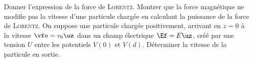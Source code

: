\documentclass[a4paper, 10pt, final, garamond]{book}
\begin{document}
\begin{enumerate}[label=\sqenumi]
\begin{isd}[lefthand ratio=.3]
\begin{isd}[sidebyside align=top]
\begin{center}
			\end{center}
		\end{isd}
	\end{isd}
	Donner l'expression de la force de \textsc{Lorentz}. Montrer que la force
	magnétique ne modifie pas la vitesse d'une particule chargée en calculant la
	puissance de la force de \textsc{Lorentz}.
	\smallbreak
	\vspace{-15pt}
	\psw{
		\[
			\Ff \stm{=} q \left( \Ef + \vf \wedge \Bf \right)
			\Ra
			\Pc(\Ff) = q \left( \Ef + \vf \wedge \Bf \right)\cdot \vf
			= q\Ef\cdot\vf +
			q\underbracket[1pt]{\underbracket[1pt]{\vf\wedge\Bf}_{\perp\vf}\cdot\vf}_{=0}
			\Lra
			\boxed{\Pc(\Ff) \stm[-1]{=} q\Ef\cdot\vf} \stm{=} \dv{\Ec_c}{t}
		\]
	}
	\vspace{-15pt}
	On suppose une particule chargée positivement, arrivant en $z = 0$ à la vitesse
	$\vfo = v_0\uz$ dans un champ électrique $\Ef = E \uz$, créé par une tension
	$U$ entre les potentiels $V(0)$ et $V(d)$. Déterminer la vitesse de la
	particule en sortie.

\end{enumerate}
\end{document}
